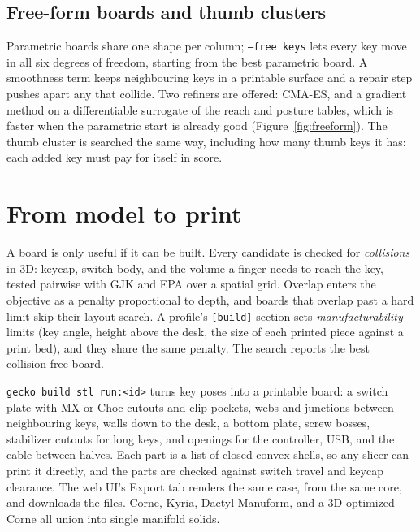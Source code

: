 \documentclass{gecko-paper}
\begin{document}
\begin{paperbody}

\subsection{Free-form boards and thumb clusters}
Parametric boards share one shape per column; \texttt{--free keys} lets every key move in all six degrees of freedom, starting from the best parametric board. A smoothness term keeps neighbouring keys in a printable surface and a repair step pushes apart any that collide. Two refiners are offered: CMA-ES, and a gradient method on a differentiable surrogate of the reach and posture tables, which is faster when the parametric start is already good (Figure~\ref{fig:freeform}). The thumb cluster is searched the same way, including how many thumb keys it has: each added key must pay for itself in score.


\section{From model to print}\label{sec:print}
A board is only useful if it can be built. Every candidate is checked for \emph{collisions} in 3D: keycap, switch body, and the volume a finger needs to reach the key, tested pairwise with GJK and EPA over a spatial grid. Overlap enters the objective as a penalty proportional to depth, and boards that overlap past a hard limit skip their layout search. A profile's \texttt{[build]} section sets \emph{manufacturability} limits (key angle, height above the desk, the size of each printed piece against a print bed), and they share the same penalty. The search reports the best collision-free board.

\texttt{gecko build stl run:<id>} turns key poses into a printable board: a switch plate with MX or Choc cutouts and clip pockets, webs and junctions between neighbouring keys, walls down to the desk, a bottom plate, screw bosses, stabilizer cutouts for long keys, and openings for the controller, USB, and the cable between halves. Each part is a list of closed convex shells, so any slicer can print it directly, and the parts are checked against switch travel and keycap clearance. The web UI's Export tab renders the same case, from the same core, and downloads the files. Corne, Kyria, Dactyl-Manuform, and a 3D-optimized Corne all union into single manifold solids.


\end{paperbody}
\end{document}

